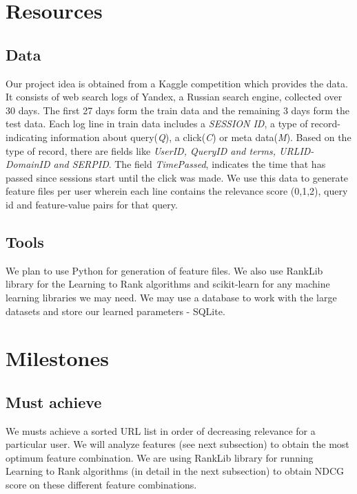 \documentclass[11pt]{article}
\begin{document}
\section{Resources}
\subsection{Data}
Our project idea is obtained from a Kaggle competition which provides the data. It consists of web search logs of Yandex, a Russian search engine, collected over 30 days. The first 27 days form the train data and the remaining 3 days form the test data. \newline
Each log line in train data includes a \textsl{SESSION ID}, a type of record- indicating information about query(\textsl{Q}), a click(\textsl{C}) or meta data(\textsl{M}). Based on the type of record, there are fields like \textsl{UserID, QueryID and terms, URLID-DomainID and SERPID}. The field \textsl{TimePassed}, indicates the time that has passed since sessions start until the click was made. We use this data to generate feature files per user wherein each line contains the relevance score (0,1,2), query id and feature-value pairs for that query.

\subsection{Tools}
We plan to use Python for generation of feature files. We also use RankLib library for the Learning to Rank algorithms and scikit-learn for any machine learning libraries we may need. We may use a database to work with the large datasets and store our learned parameters - SQLite.

\section{Milestones}
\subsection{Must achieve}
We musts achieve a sorted URL list in order of decreasing relevance for a particular user. We will analyze features (see next subsection) to obtain the most optimum feature combination. We are using  RankLib library for running Learning to Rank algorithms (in detail in the next subsection) to obtain NDCG score on these different feature combinations. 
\end{document}
